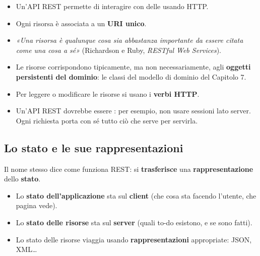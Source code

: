 \begin{itemize}
  \item Un'API REST permette di interagire con delle  usando HTTP.
  \item Ogni risorsa è associata a un \textbf{URI unico}.
  \item \textit{«Una risorsa è qualunque cosa sia abbastanza importante da essere citata come una cosa a sé»}
        (Richardson e Ruby, \textit{RESTful Web Services}).
  \item Le risorse corrispondono tipicamente, ma non necessariamente, agli \textbf{oggetti persistenti del dominio}: le
        classi del modello di dominio del Capitolo 7.
  \item Per leggere o modificare le risorse si usano i \textbf{verbi HTTP}.
  \item Un'API REST dovrebbe essere : per esempio, non usare sessioni lato server. Ogni richiesta porta
        con sé tutto ciò che serve per servirla.
\end{itemize}


\subsection{Lo stato e le sue rappresentazioni}

Il nome stesso dice come funziona REST: si \textbf{trasferisce} una \textbf{rappresentazione} dello \textbf{stato}.
\begin{itemize}
  \item Lo \textbf{stato dell'applicazione} sta sul \textbf{client} (che cosa sta facendo l'utente, che pagina vede).
  \item Lo \textbf{stato delle risorse} sta sul \textbf{server} (quali to-do esistono, e se sono fatti).
  \item Lo stato delle risorse viaggia usando \textbf{rappresentazioni} appropriate: JSON, XML\ldots
\end{itemize}

